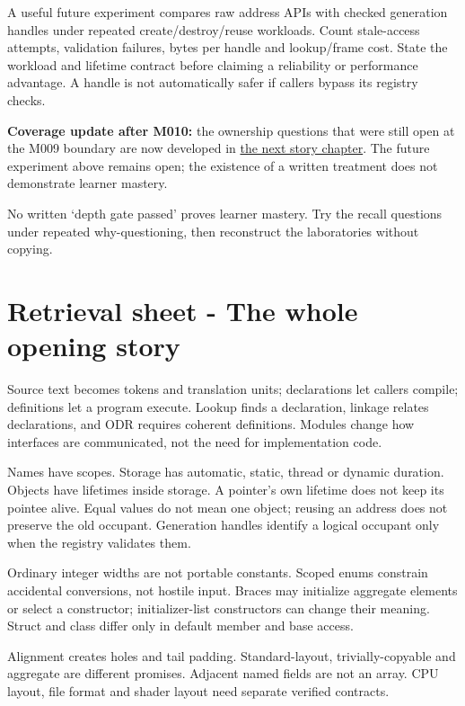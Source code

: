 A useful future experiment compares raw address APIs with checked generation handles under repeated create/destroy/reuse workloads. Count stale-access attempts, validation failures, bytes per handle and lookup/frame cost. State the workload and lifetime contract before claiming a reliability or performance advantage. A handle is not automatically safer if callers bypass its registry checks.

\textbf{Coverage update after M010:} the ownership questions that were still open at the M009 boundary are now developed in \hyperref[05-engine-i-ch004-from-a-live-object-to-responsible-resource-ownership]{the next story chapter}. The future experiment above remains open; the existence of a written treatment does not demonstrate learner mastery.

No written `depth gate passed' proves learner mastery. Try the recall questions under repeated why-questioning, then reconstruct the laboratories without copying.

\section{Retrieval sheet - The whole opening story}\label{05-engine-i-ch004-retrieval-sheet---the-whole-opening-story}

\hypertarget{05-engine-i-ch004-retrieval-sheet---the-whole-opening-story}{}

Source text becomes tokens and translation units; declarations let callers compile; definitions let a program execute. Lookup finds a declaration, linkage relates declarations, and ODR requires coherent definitions. Modules change how interfaces are communicated, not the need for implementation code.

Names have scopes. Storage has automatic, static, thread or dynamic duration. Objects have lifetimes inside storage. A pointer's own lifetime does not keep its pointee alive. Equal values do not mean one object; reusing an address does not preserve the old occupant. Generation handles identify a logical occupant only when the registry validates them.

Ordinary integer widths are not portable constants. Scoped enums constrain accidental conversions, not hostile input. Braces may initialize aggregate elements or select a constructor; initializer-list constructors can change their meaning. Struct and class differ only in default member and base access.

Alignment creates holes and tail padding. Standard-layout, trivially-copyable and aggregate are different promises. Adjacent named fields are not an array. CPU layout, file format and shader layout need separate verified contracts.

